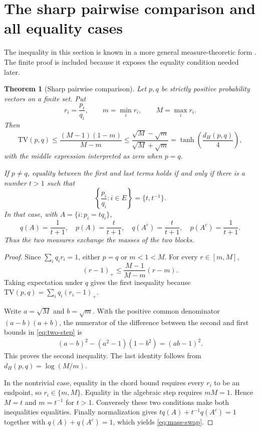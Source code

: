 \documentclass[11pt]{article}
\newtheorem{theorem}{Theorem}[section]
\newcommand{\TV}{\mathrm{TV}}
\newcommand{\1}{\mathbf{1}}
\begin{document}
\section{The sharp pairwise comparison and all equality cases}

The inequality in this section is known in a more general measure-theoretic
form \cite{CohenFausti2024}.  The finite proof is included because it exposes
the equality condition needed later.

\begin{theorem}[Sharp pairwise comparison]\label{thm:pairwise}
Let $p,q$ be strictly positive probability vectors on a finite set.  Put
\[
 r_i=\frac{p_i}{q_i},\qquad m=\min_i r_i,\qquad M=\max_i r_i.
\]
Then
\begin{equation}\label{eq:two-step}
 \TV(p,q)
 \leq \frac{(M-1)(1-m)}{M-m}
 \leq \frac{\sqrt M-\sqrt m}{\sqrt M+\sqrt m}
 =\tanh\!\left(\frac{d_H(p,q)}4\right),
\end{equation}
with the middle expression interpreted as zero when $p=q$.

If $p\ne q$, equality between the first and last terms holds if and only if
there is a number $t>1$ such that
\begin{equation}\label{eq:reciprocal-ratio}
 \left\{\frac{p_i}{q_i}:i\in E\right\}=\{t,t^{-1}\}.
\end{equation}
In that case, with $A=\{i:p_i=tq_i\}$,
\begin{equation}\label{eq:mass-swap}
 q(A)=\frac1{t+1},\quad p(A)=\frac{t}{t+1},\quad
 q(A^c)=\frac{t}{t+1},\quad p(A^c)=\frac1{t+1}.
\end{equation}
Thus the two measures exchange the masses of the two blocks.
\end{theorem}

\begin{proof}
Since $\sum_iq_ir_i=1$, either $p=q$ or $m<1<M$.  For every
$r\in[m,M]$,
\[
 (r-1)_+\leq \frac{M-1}{M-m}(r-m).
\]
Taking expectation under $q$ gives the first inequality because
$\TV(p,q)=\sum_iq_i(r_i-1)_+$.

Write $a=\sqrt M$ and $b=\sqrt m$.  With the positive common denominator
$(a-b)(a+b)$, the numerator of the difference between the second and first
bounds in \eqref{eq:two-step} is
\begin{align*}
 (a-b)^2-(a^2-1)(1-b^2)=(ab-1)^2.
\end{align*}
This proves the second inequality.  The last identity follows from
$d_H(p,q)=\log(M/m)$.

In the nontrivial case, equality in the chord bound requires every $r_i$ to
be an endpoint, so $r_i\in\{m,M\}$.  Equality in the algebraic step requires
$mM=1$.  Hence $M=t$ and $m=t^{-1}$ for $t>1$.  Conversely these two
conditions make both inequalities equalities.  Finally normalization gives
$tq(A)+t^{-1}q(A^c)=1$ together with $q(A)+q(A^c)=1$, which yields
\eqref{eq:mass-swap}.
\end{proof}
\end{document}
